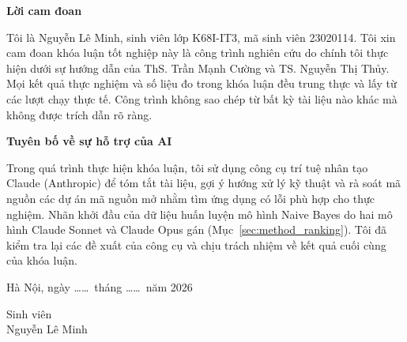 \setcounter{page}{1}
\begin{center}
\textbf{\large{Lời cam đoan}}
\end{center}

Tôi là Nguyễn Lê Minh, sinh viên lớp K68I-IT3, mã sinh viên 23020114. Tôi xin cam đoan khóa luận tốt nghiệp này là công trình nghiên cứu do chính tôi thực hiện dưới sự hướng dẫn của ThS. Trần Mạnh Cường và TS. Nguyễn Thị Thủy. Mọi kết quả thực nghiệm và số liệu đo trong khóa luận đều trung thực và lấy từ các lượt chạy thực tế. Công trình không sao chép từ bất kỳ tài liệu nào khác mà không được trích dẫn rõ ràng.

\medskip
\noindent\textbf{Tuyên bố về sự hỗ trợ của AI}

Trong quá trình thực hiện khóa luận, tôi sử dụng công cụ trí tuệ nhân tạo Claude (Anthropic) để tóm tắt tài liệu, gợi ý hướng xử lý kỹ thuật và rà soát mã nguồn các dự án mã nguồn mở nhằm tìm ứng dụng có lỗi phù hợp cho thực nghiệm. Nhãn khởi đầu của dữ liệu huấn luyện mô hình Naive Bayes do hai mô hình Claude Sonnet và Claude Opus gán (Mục~\ref{sec:method_ranking}). Tôi đã kiểm tra lại các đề xuất của công cụ và chịu trách nhiệm về kết quả cuối cùng của khóa luận.

\begin{flushright}
Hà Nội, ngày \dots\dots\ tháng \dots\dots\ năm 2026
\end{flushright}

\hfill\begin{minipage}{6cm}
\centering
Sinh viên
\\[2cm]
Nguyễn Lê Minh
\end{minipage}
